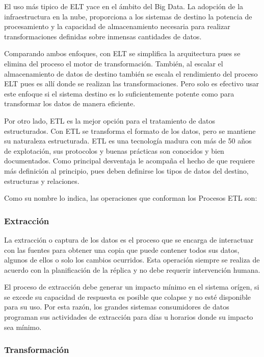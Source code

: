 El uso m\'as tipico de ELT yace en el \'ambito del Big Data\cite{raunakjhawar_ETL_microsoft}. La adopción de la 
infraestructura en la nube, proporciona a los sistemas de destino la potencia de procesamiento y la capacidad de almacenamiento
necesaria para realizar transformaciones definidas sobre inmensas cantidades de datos.

Comparando ambos enfoques, con ELT se simplifica la arquitectura pues se elimina del proceso el motor de transformación. 
Tambi\'en, al escalar el almacenamiento de datos de destino también se escala el rendimiento del proceso ELT pues es all\'i
donde se realizan las transformaciones. Pero solo es efectivo usar este enfoque si el sistema destino es lo suficientemente
potente como para transformar los datos de manera eficiente.

Por otro lado, ETL es la mejor opci\'on para el tratamiento de datos estructurados\cite{etl_vs_elt_amazon}. Con 
ETL se transforma el formato de los datos, pero se mantiene su naturaleza estructurada. ETL es una tecnología madura 
con m\'as de 50 años de explotaci\'on, sus protocolos y buenas pr\'acticas son conocidos y bien documentados. Como principal 
desventaja le acompaña el hecho de que requiere m\'as definici\'on al principio, pues deben definirse los tipos de datos 
del destino, estructuras y relaciones.

Como su nombre lo indica, las operaciones que conforman los Procesos ETL son:

\subsubsection{Extracci\'on}

La extracción o captura de los datos es el proceso que se encarga de interactuar con las fuentes para 
obtener una copia que puede contener todos sus datos, algunos de ellos o solo los cambios ocurridos. Esta operaci\'on 
siempre se realiza de acuerdo con la planificación de la réplica y no debe requerir intervención humana. 

El proceso de extracci\'on debe generar un impacto m\'inimo en el sistema or\'igen, si se excede su capacidad de respuesta 
es posible que colapse y no est\'e disponible para su uso. Por esta raz\'on, los grandes 
sistemas consumidores de datos programan sus actividades de extracci\'on para d\'ias u horarios donde su impacto sea 
m\'inimo. 

\subsubsection{Transformaci\'on}

